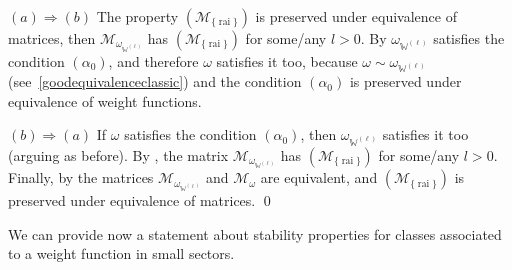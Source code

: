 \documentclass[11pt,a4paper]{article}
\theoremstyle{plain}
\theoremstyle{definition}
\newcommand{\red}[1]{{\color{red}#1}}
\newcommand{\W}{\mathbb{W}}
\let\on=\operatorname
\begin{document}
%

$(a)\Rightarrow(b)$ The property \hyperlink{R-rai}{$(\mathcal{M}_{\{\on{rai}\}})$} is preserved under equivalence of matrices, then $\mathcal{M}_{\omega_{{\W}^{(\ell)}}}$ has \hyperlink{R-rai}{$(\mathcal{M}_{\{\on{rai}\}})$} for some/any $l>0$. By \cite[Thm. 4.5 $(iv)\Leftrightarrow(i)$]{subaddlike} $\omega_{{\W}^{(\ell)}}$ satisfies the condition $(\alpha_0)$, and therefore $\omega$ satisfies it too, because $\omega\sim\omega_{{\W}^{(\ell)}}$ (see~\eqref{goodequivalenceclassic}) and the condition $(\alpha_0)$ is preserved under equivalence of weight functions.


$(b)\Rightarrow(a)$ If $\omega$ satisfies the condition $(\alpha_0)$, then $\omega_{{\W}^{(\ell)}}$ satisfies it too (arguing as before). By \cite[Thm. 4.5 $(i)\Leftrightarrow(iv)$]{subaddlike}, the matrix $\mathcal{M}_{\omega_{{\W}^{(\ell)}}}$ has \hyperlink{R-rai}{$(\mathcal{M}_{\{\on{rai}\}})$} for some/any $l>0$. Finally, by \cite[Lemma 5.3.1]{dissertation} the matrices $\mathcal{M}_{\omega_{{\W}^{(\ell)}}}$ and $\mathcal{M}_{\omega} $ are equivalent, and \hyperlink{R-rai}{$(\mathcal{M}_{\{\on{rai}\}})$} is preserved under equivalence of matrices.
\qed\enddemo
\vspace{6pt}

We can provide now a statement about stability properties for classes associated to a weight function in small sectors.
\end{document}
